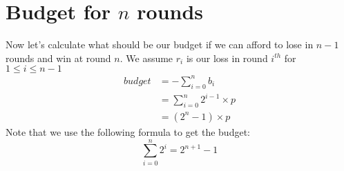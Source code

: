 \documentclass{book}
\begin{document}
	\section{Budget for $n$ rounds}
	Now let's calculate what should be our budget if we can afford to lose in ${n -1}$ rounds and win at round $n$. We assume $r_i$ is our loss in round $i^{th}$ for $1 \le i \le n - 1$
	\begin{equation*}
		\begin{split}
			budget &= -\sum_{i = 0}^{n}{b_i} \\
			&= \sum_{i = 0}^{n}{2^{i - 1} \times p} \\
			&= (2^n - 1) \times p
		\end{split}
	\end{equation*}
	Note that we use the following formula to get the budget:
	\begin{equation*}
		\sum_{i = 0}^{n}{2^i} = 2^{n + 1} - 1
	\end{equation*}
\end{document}
